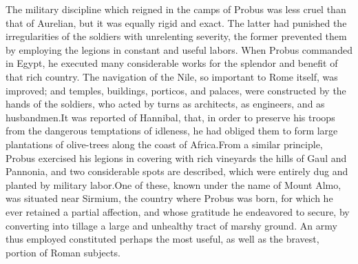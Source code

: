 The military discipline which reigned in the camps of Probus was
less cruel than that of Aurelian, but it was equally rigid and
exact. The latter had punished the irregularities of the soldiers
with unrelenting severity, the former prevented them by employing
the legions in constant and useful labors. When Probus commanded
in Egypt, he executed many considerable works for the splendor
and benefit of that rich country. The navigation of the Nile, so
important to Rome itself, was improved; and temples, buildings,
porticos, and palaces, were constructed by the hands of the
soldiers, who acted by turns as architects, as engineers, and as
husbandmen.\footnotemark[57] It was reported of Hannibal, that, in order to
preserve his troops from the dangerous temptations of idleness,
he had obliged them to form large plantations of olive-trees
along the coast of Africa.\footnotemark[58] From a similar principle, Probus
exercised his legions in covering with rich vineyards the hills
of Gaul and Pannonia, and two considerable spots are described,
which were entirely dug and planted by military labor.\footnotemark[59] One of
these, known under the name of Mount Almo, was situated near
Sirmium, the country where Probus was born, for which he ever
retained a partial affection, and whose gratitude he endeavored
to secure, by converting into tillage a large and unhealthy tract
of marshy ground. An army thus employed constituted perhaps the
most useful, as well as the bravest, portion of Roman subjects.




